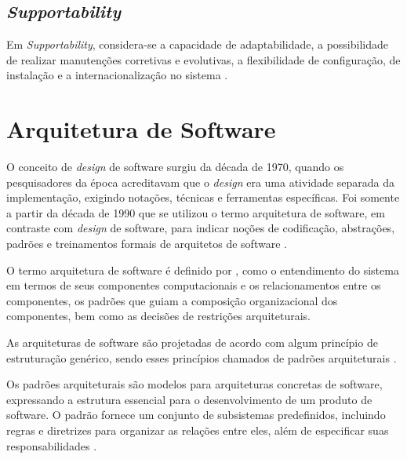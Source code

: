 \subsection{\textit{Supportability}}
\label{subsec:suportabilidade}

Em \textit{Supportability}, considera-se a capacidade de adaptabilidade, a possibilidade de realizar manutenções corretivas e evolutivas, a flexibilidade de configuração, de instalação e a internacionalização no sistema \cite{cintra2006implementaccao}.

\section{Arquitetura de Software}
\label{sec:arquitetura}

O conceito de \textit{design} de software surgiu da década de 1970, quando os pesquisadores da época acreditavam que o \textit{design} era uma atividade separada da implementação, exigindo notações, técnicas e ferramentas específicas. Foi somente a partir da década de 1990 que se utilizou o termo arquitetura de software, em contraste com \textit{design} de software, para indicar noções de codificação, abstrações, padrões e treinamentos formais de arquitetos de software \cite{perry1992foundations}.

O termo arquitetura de software é definido por \cite{shaw1996software}, como o entendimento do sistema em termos de seus componentes computacionais e os relacionamentos entre os componentes, os padrões que guiam a composição organizacional dos componentes, bem como as decisões de restrições arquiteturais. 

As arquiteturas de software são projetadas de acordo com algum princípio de estruturação genérico, sendo esses princípios chamados de padrões arquiteturais \cite{buschmann1996system}. 

Os padrões arquiteturais são modelos para arquiteturas concretas de software, expressando a estrutura essencial para o desenvolvimento de um produto de software. O padrão fornece um conjunto de subsistemas predefinidos, incluindo regras e diretrizes para organizar as relações entre eles, além de especificar suas responsabilidades \cite{buschmann1996system}. 

